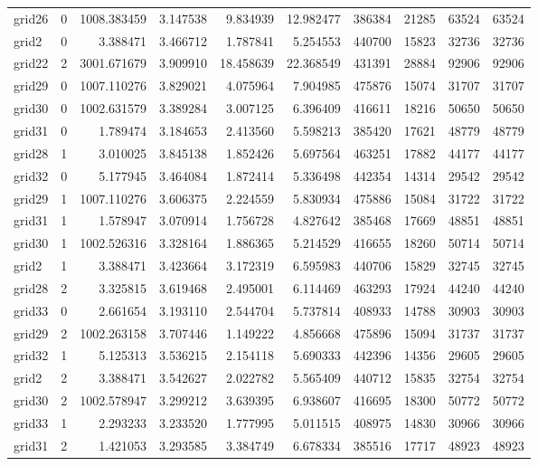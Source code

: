 \begin{longtable}{|l|r|r|r|r|r|r|r|r|r|}
grid26 & 0 & 1008.383459 & 3.147538 & 9.834939 & 12.982477 & 386384 & 21285 & 63524 & 63524 \\
grid2 & 0 & 3.388471 & 3.466712 & 1.787841 & 5.254553 & 440700 & 15823 & 32736 & 32736 \\
grid22 & 2 & 3001.671679 & 3.909910 & 18.458639 & 22.368549 & 431391 & 28884 & 92906 & 92906 \\
grid29 & 0 & 1007.110276 & 3.829021 & 4.075964 & 7.904985 & 475876 & 15074 & 31707 & 31707 \\
grid30 & 0 & 1002.631579 & 3.389284 & 3.007125 & 6.396409 & 416611 & 18216 & 50650 & 50650 \\
grid31 & 0 & 1.789474 & 3.184653 & 2.413560 & 5.598213 & 385420 & 17621 & 48779 & 48779 \\
grid28 & 1 & 3.010025 & 3.845138 & 1.852426 & 5.697564 & 463251 & 17882 & 44177 & 44177 \\
grid32 & 0 & 5.177945 & 3.464084 & 1.872414 & 5.336498 & 442354 & 14314 & 29542 & 29542 \\
grid29 & 1 & 1007.110276 & 3.606375 & 2.224559 & 5.830934 & 475886 & 15084 & 31722 & 31722 \\
grid31 & 1 & 1.578947 & 3.070914 & 1.756728 & 4.827642 & 385468 & 17669 & 48851 & 48851 \\
grid30 & 1 & 1002.526316 & 3.328164 & 1.886365 & 5.214529 & 416655 & 18260 & 50714 & 50714 \\
grid2 & 1 & 3.388471 & 3.423664 & 3.172319 & 6.595983 & 440706 & 15829 & 32745 & 32745 \\
grid28 & 2 & 3.325815 & 3.619468 & 2.495001 & 6.114469 & 463293 & 17924 & 44240 & 44240 \\
grid33 & 0 & 2.661654 & 3.193110 & 2.544704 & 5.737814 & 408933 & 14788 & 30903 & 30903 \\
grid29 & 2 & 1002.263158 & 3.707446 & 1.149222 & 4.856668 & 475896 & 15094 & 31737 & 31737 \\
grid32 & 1 & 5.125313 & 3.536215 & 2.154118 & 5.690333 & 442396 & 14356 & 29605 & 29605 \\
grid2 & 2 & 3.388471 & 3.542627 & 2.022782 & 5.565409 & 440712 & 15835 & 32754 & 32754 \\
grid30 & 2 & 1002.578947 & 3.299212 & 3.639395 & 6.938607 & 416695 & 18300 & 50772 & 50772 \\
grid33 & 1 & 2.293233 & 3.233520 & 1.777995 & 5.011515 & 408975 & 14830 & 30966 & 30966 \\
grid31 & 2 & 1.421053 & 3.293585 & 3.384749 & 6.678334 & 385516 & 17717 & 48923 & 48923 \\

\end{longtable}
